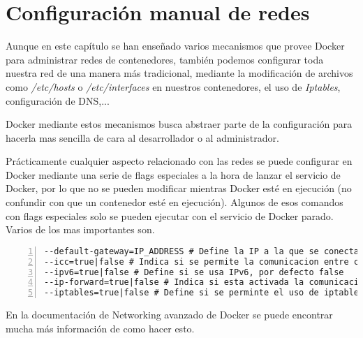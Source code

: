 \fi
	
	\section{Configuración manual de redes}
	Aunque en este capítulo se han enseñado varios mecanismos que provee Docker para administrar redes de contenedores, también podemos configurar toda nuestra red de una manera más tradicional, mediante la modificación de archivos como \emph{/etc/hosts} o \emph{/etc/interfaces} en nuestros contenedores, el uso de \emph{Iptables}, configuración de DNS,... 
	
	Docker mediante estos mecanismos busca abstraer parte de la configuración para hacerla mas sencilla de cara al desarrollador o al administrador.
	
	Prácticamente cualquier aspecto relacionado con las redes se puede configurar en Docker mediante una serie de flags especiales a la hora de lanzar el servicio de Docker, por lo que no se pueden modificar mientras Docker esté en ejecución (no confundir con que un contenedor esté en ejecución). Algunos de esos comandos con flags especiales solo se pueden ejecutar con el servicio de Docker parado. Varios de los mas importantes son.
	
	\begin{lstlisting}[style=consola,numbers=left]
--default-gateway=IP_ADDRESS # Define la IP a la que se conectaran los contenedores de Docker al crearse, por defecto se usa la de docker0
--icc=true|false # Indica si se permite la comunicacion entre contenedores, por defecto true
--ipv6=true|false # Define si se usa IPv6, por defecto false
--ip-forward=true|false # Indica si esta activada la comunicacion entre los contenedores y el exterior, por defecto true
--iptables=true|false # Define si se perminte el uso de iptables (filtra direcciones y puertos, se usa como firewall en sistemas tipo UNIX)
	\end{lstlisting}
	
	En la documentación de Networking avanzado de Docker \cite{docker-network-advanced} se puede encontrar mucha más información de como hacer esto.
	